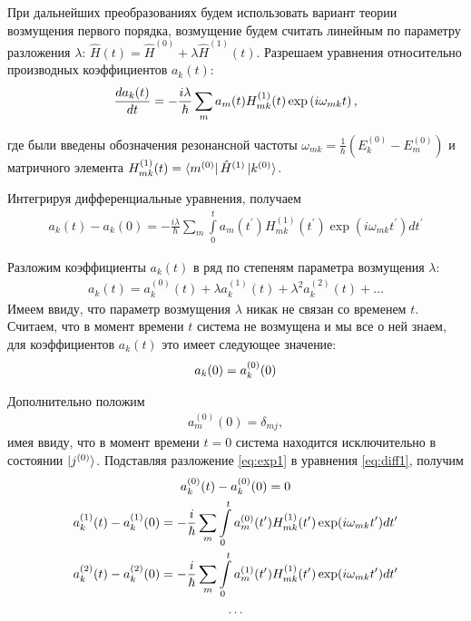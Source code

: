 \documentclass[12pt]{article}
\newcommand{\lb}{\left(}
\newcommand{\rb}{\right)}
\newcommand{\vverh}{\vspace*{-0.15cm}}
\begin{document}
При дальнейших преобразованиях будем использовать вариант теории возмущения первого порядка, возмущение будем считать линейным по параметру разложения $\lambda$: $\hat{H}(t) = \hat{H}^{(0)} + \lambda \hat{H}^{(1)}(t)$. Разрешаем уравнения относительно производных коэффициентов $a_k(t)$:
\vverh
\begin{gather}
	\frac{d a_k(t)}{dt} = - \frac{i \lambda}{\hbar} \sum_m a_m(t) H_{mk}^{(1)}(t) \exp \lb i \omega_{mk} t \rb , \notag
\end{gather}

\vverh где были введены обозначения резонансной частоты $\omega_{mk} = \displaystyle \frac{1}{\hbar} \lb E_k^{(0)} - E_m^{(0)} \rb$ и матричного элемента $H_{mk}^{(1)}(t) = \bra{m^{(0)}} \hat{H}^{(1)} \ket{k^{(0)}}$.

Интегрируя дифференциальные уравнения, получаем
\vverh
\begin{gather}
	a_k(t) - a_k(0) = - \frac{i \lambda}{\hbar} \sum_m \int\limits_0^t a_m(t^\prime) H_{mk}^{(1)} (t^\prime) \exp \lb i \omega_{mk} t^\prime \rb d t^\prime \label{eq:diff1}
\end{gather}

Разложим коэффициенты $a_k(t)$ в ряд по степеням параметра возмущения $\lambda$:
\vverh
\begin{gather}
	a_k(t) = a_k^{(0)}(t) + \lambda a_k^{(1)}(t) + \lambda^2 a_k^{(2)}(t) + \dots \label{eq:exp1}
\end{gather}
Имеем ввиду, что параметр возмущения $\lambda$ никак не связан со временем $t$. Считаем, что в момент времени $t$ система не возмущена и мы все о ней знаем, для коэффициентов $a_k(t)$ это имеет следующее значение:
\vverh
\begin{gather}
	a_k(0) = a_k^{(0)}(0) \notag 
\end{gather}

Дополнительно положим 
\vverh
\begin{gather}
	a_m^{(0)}(0) = \delta_{mj}, \label{eq:exp2}
\end{gather}
имея ввиду, что в момент времени $t = 0$ система находится исключительно в состоянии $\ket{j^{(0)}}$. Подставляя разложение \eqref{eq:exp1} в уравнения \eqref{eq:diff1}, получим
\vverh
\begin{gather}
	a_k^{(0)}(t) - a_k^{(0)}(0) = 0 \notag \\
	a_k^{(1)}(t) - a_k^{(1)}(0) = - \frac{i}{\hbar} \sum_m \int\limits_0^t a_m^{(0)}(t^\prime) H_{mk}^{(1)} (t^\prime) \exp (i \omega_{mk} t^\prime) dt^\prime \notag \\
	a_k^{(2)}(t) - a_k^{(2)}(0) = - \frac{i}{\hbar} \sum_m \int\limits_0^t a_m^{(1)} (t^\prime) H_{mk}^{(1)} (t^\prime) \exp (i \omega_{mk} t^\prime) d t^\prime \notag \\
 \dots \notag 
\end{gather}
\end{document}
